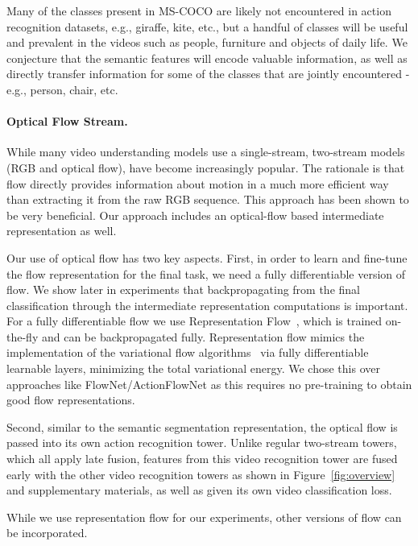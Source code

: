 \documentclass[final]{cvpr}
\begin{document}
Many of the classes present in MS-COCO are likely not encountered in action recognition datasets, e.g., giraffe, kite, etc., but a handful of classes will be useful and prevalent in the videos such as people, furniture and objects of daily life. We conjecture that the semantic features will encode valuable information, as well as directly transfer information for some of the classes that are jointly encountered - e.g., person, chair, etc.

\paragraph{Optical Flow Stream.}
While many video understanding models use a single-stream, two-stream models~\cite{simonyan2014two,carreira2017quo} (RGB and optical flow), have become increasingly popular. The rationale is that flow directly provides information about motion in a much more efficient way than extracting it from the raw RGB sequence. This approach has been shown to be very beneficial. Our approach includes an optical-flow based intermediate representation as well.

Our use of optical flow has two key aspects.
First, in order to learn and fine-tune the flow representation for the final task, we need a fully differentiable version of flow. We show later in experiments that backpropagating from the final classification through the intermediate representation computations is important. For a fully differentiable flow we use Representation Flow~\cite{piergiovanni2018representation}, which is trained on-the-fly and can be backpropagated fully. 
Representation flow mimics the implementation of the variational flow algorithms~\cite{brox2004high} via fully differentiable learnable layers, minimizing the total variational energy. We chose this over approaches like FlowNet/ActionFlowNet \cite{ilg2017flownet,ng2018actionflownet} as this requires no pre-training to obtain good flow representations.


Second, similar to the semantic segmentation representation, the optical flow is passed into its own action recognition tower. Unlike regular two-stream towers, which all apply late fusion, features from this video recognition tower are fused early with the other video recognition towers as shown in Figure~\ref{fig:overview} and supplementary materials, as well as given its own video classification loss. 

While we use representation flow for our experiments, other versions of flow can be incorporated. 
\end{document}
